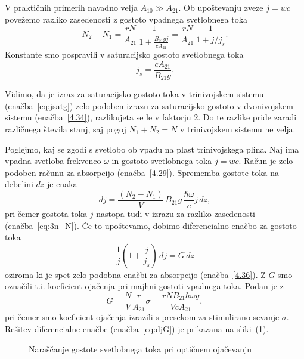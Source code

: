 V praktičnih primerih navadno velja $A_{10}\gg A_{21}$. Ob upoštevanju zveze $j=wc$ povežemo
razliko zasedenosti z gostoto vpadnega svetlobnega toka
\begin{equation}
N_{2}-N_{1}=\frac{rN}{A_{21}} \, \frac{1}{1+\frac{B_{21}gj}{c A_{21}}} = 
\frac{rN}{A_{21}} \, \frac{1}{1+j/j_s}.
\label{eq:3n_N}
\end{equation}
Konstante smo pospravili v saturacijsko gostoto svetlobnega toka 
\begin{equation}
j_s = \frac{c A_{21}}{B_{21}g}.
\label{eq:jsatg}
\end{equation}
\begin{remark}
 Vidimo, da je  izraz za saturacijsko gostoto toka v trinivojskem sistemu 
 (enačba~\ref{eq:jsatg}) zelo podoben izrazu za saturacijsko gostoto v dvonivojskem
 sistemu (enačba~\ref{4.34}), razlikujeta se le
v faktorju 2. Do te razlike pride zaradi različnega števila stanj, saj pogoj $N_{1}+N_{2}=N$
v trinivojskem sistemu ne velja. 
\end{remark}
Poglejmo, kaj se zgodi s svetlobo ob vpadu na plast trinivojskega plina. Naj ima vpadna
svetloba frekvenco $\omega$ in gostoto svetlobnega toka $j=wc$. Račun je zelo podoben 
računu za absorpcijo (enačba~\ref{4.29}). Sprememba gostote toka na debelini $dz$ je enaka
\begin{equation}
dj=\frac{(N_{2}-N_{1})}{V}\, B_{21}g\, \frac{\hbar\omega}{c}j\, dz,
\label{eq:dj}
\end{equation}
pri čemer gostota toka $j$ nastopa tudi v izrazu za razliko
zasedenosti (enačba~\ref{eq:3n_N}). Če to upoštevamo, 
dobimo diferencialno enačbo za gostoto toka
\begin{equation}
\frac{1}{j}\left(1+\frac{j}{j_{s}}\right)\, dj=G\, dz
\label{4.43}
\end{equation}
oziroma
ki je spet zelo podobna enačbi za absorpcijo (enačba~\ref{4.36}).
Z $G$ smo označili t.i. koeficient ojačenja pri majhni gostoti vpadnega
toka. Podan je z 
\begin{equation}
G=\frac{N}{V}\frac{r}{A_{21}}\sigma=\frac{rNB_{21}\hbar\omega g}{VcA_{21}},
\label{4.44}
\end{equation}
pri čemer smo koeficient ojačenja izrazili s presekom za stimulirano 
sevanje $\sigma$. 
Rešitev diferencialne enačbe (enačba~\ref{eq:djG}) je prikazana na sliki~(\ref{fig:ojacanje}). 
\begin{figure}[h]
\centering
\def\svgwidth{100truemm} 

\caption{Naraščanje gostote svetlobnega toka pri optičnem ojačevanju}
\label{fig:ojacanje}
\end{figure}

